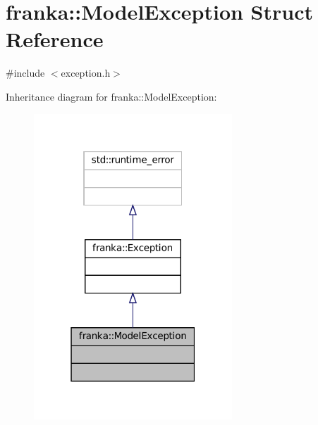 \hypertarget{structfranka_1_1ModelException}{}\section{franka\+:\+:Model\+Exception Struct Reference}
\label{structfranka_1_1ModelException}


{\ttfamily \#include $<$exception.\+h$>$}



Inheritance diagram for franka\+:\+:Model\+Exception\+:
\nopagebreak
\begin{figure}[H]
\begin{center}
\leavevmode
\includegraphics[width=211pt]{structfranka_1_1ModelException__inherit__graph}
\end{center}
\end{figure}



